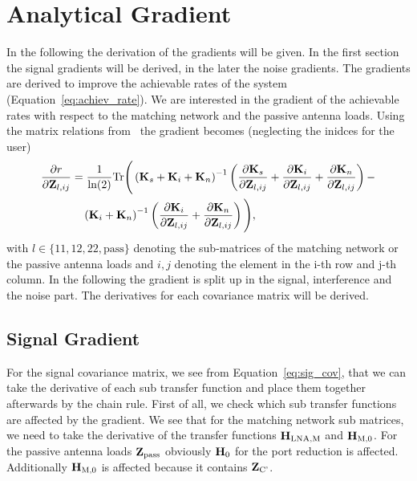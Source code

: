 \chapter{Analytical Gradient}

In the following the derivation of the gradients will be given.
In the first section the signal gradients will be derived, in the later the noise gradients.
The gradients are derived to improve the achievable rates of the system (Equation~\eqref{eq:achiev_rate}).
We are interested in the gradient of the achievable rates with respect to the matching network and the passive antenna loads.
Using the matrix relations from~\cite{Codebook12} the gradient becomes (neglecting the inidces for the user)
\begin{align}
\label{eq:gradient}\nonumber
\frac{\partial r}{\partial\mathbf{Z}_{l,ij}} &= \frac{1}{\text{ln}(2)} 
\text{Tr}\Bigg(\left(\mathbf{K}_s + \mathbf{K}_i + \mathbf{K}_n\right)^{-1}
\left(\frac{\partial\mathbf{K}_s}{\partial\mathbf{Z}_{l,ij}}+
 \frac{\partial\mathbf{K}_i}{\partial\mathbf{Z}_{l,ij}}+
 \frac{\partial\mathbf{K}_n}{\partial\mathbf{Z}_{l,ij}}\right)-\\
 &\quad\left(\mathbf{K}_i+\mathbf{K}_n\right)^{-1}
 \left(\frac{\partial\mathbf{K}_i}{\partial\mathbf{Z}_{l,ij}}+
 	\frac{\partial\mathbf{K}_n}{\partial\mathbf{Z}_{l,ij}}\right)\Bigg),
\end{align}
with $l\in\{11,12,22,\text{pass}\}$ denoting the sub-matrices of the matching network or the passive antenna loads and $i,j$ denoting the element in the i-th row and j-th column.
In the following the gradient is split up in the signal, interference and the noise part.
The derivatives for each covariance matrix will be derived.

\section{Signal Gradient}
\label{sec:signal_gradient}
 For the signal covariance matrix, we see from Equation~\eqref{eq:sig_cov}, that we can take the derivative of each sub transfer function and place them together afterwards by the chain rule.
First of all, we check which sub transfer functions are affected by the gradient.
We see that for the matching network sub matrices, we need to take the derivative of the transfer functions $\mathbf{H}_\text{LNA,M}$ and $\mathbf{H}_\text{M,0}$.
For the passive antenna loads $\mathbf{Z}_\text{pass}$ obviously $\mathbf{H}_{0}$ for the port reduction is affected.
Additionally $\mathbf{H}_\text{M,0}$ is affected because it contains $\mathbf{Z}_\text{C'}$.

